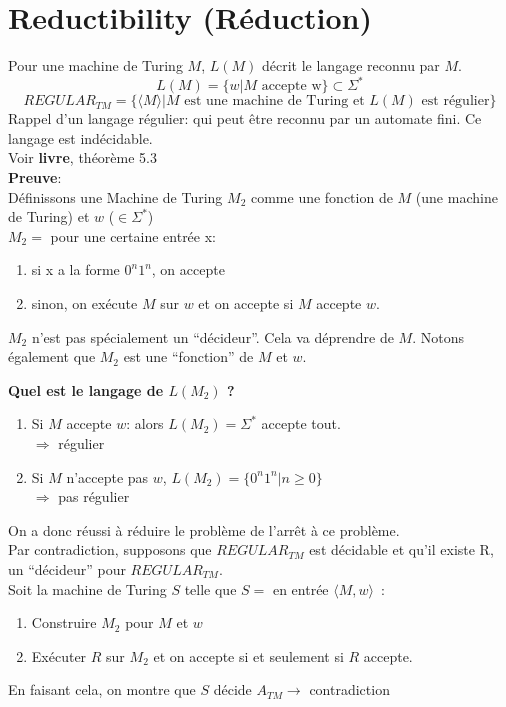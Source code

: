 \documentclass[a4paper,12pt]{article}
\begin{document}
\section{Reductibility (Réduction)}
  Pour une machine de Turing $M$, $L(M)$ décrit le langage reconnu par $M$.
  $$L(M) = \{w | M \text{ accepte w} \} \subset \Sigma^*$$
  $$REGULAR_{TM} = \{ \langle M\rangle | M \text{ est une machine de Turing et } L(M) \text{ est régulier}\}$$
  Rappel d'un langage régulier: qui peut être reconnu par un automate fini. Ce langage est indécidable.\\
  Voir \textbf{livre}, théorème 5.3\\
  \textbf{Preuve}:\\
    Définissons une Machine de Turing $M_2$ comme une fonction de $M$ (une machine de Turing) et $w$ ($\in \Sigma^*$)\\
    $M_2 = $ pour une certaine entrée x:
    \begin{enumerate}
      \item si x a la forme $0^{n}1^{n}$, on accepte
      \item sinon, on exécute $M$ sur $w$ et on accepte si $M$ accepte $w$.
    \end{enumerate}
    $M_2$ n'est pas spécialement un ``décideur''.  Cela va déprendre de $M$.  Notons également que $M_2$ est une ``fonction'' de $M$ et $w$.

  \textbf{Quel est le langage de $L(M_2)$ ?}\\
  \begin{enumerate}
    \item Si $M$ accepte $w$: alors $L(M_2) = \Sigma^*$ accepte tout.\\
      $\Rightarrow$ régulier
    \item Si $M$ n'accepte pas $w$, $L(M_2) = \{0^n 1^n | n \geq 0\}$\\
      $\Rightarrow$ pas régulier
  \end{enumerate}
  On a donc réussi à réduire le problème de l'arrêt à ce problème.\\
  Par contradiction, supposons que $REGULAR_{TM}$ est décidable et qu'il existe R, un ``décideur'' pour $REGULAR_{TM}$.\\
  Soit la machine de Turing $S$ telle que $S = $ en entrée $\langle M, w\rangle$~:
  \begin{enumerate}
    \item Construire $M_2$ pour $M$ et $w$
    \item Exécuter $R$ sur $M_2$ et on accepte si et seulement si $R$ accepte.
  \end{enumerate}
  En faisant cela, on montre que $S$ décide $A_{TM} \rightarrow$ contradiction
\end{document}
